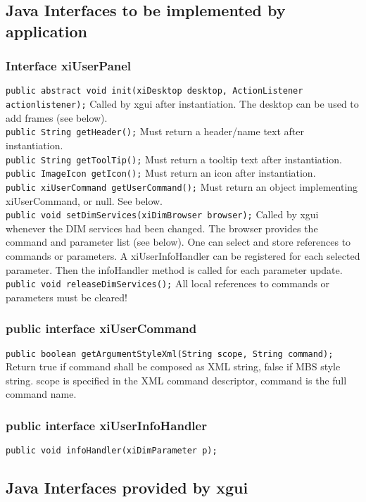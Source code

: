 \subsection{Java Interfaces to be implemented by application}
\subsubsection{Interface xiUserPanel}
{\tt public abstract void init(xiDesktop desktop, ActionListener actionlistener);}
Called by xgui after instantiation. The desktop can be used to add frames (see below).\\
{\tt public String getHeader();}
Must return a header/name text after instantiation.\\
{\tt public String getToolTip();}
Must return a tooltip text after instantiation.\\
{\tt public ImageIcon getIcon();}
Must return an icon after instantiation.\\
{\tt public xiUserCommand getUserCommand();}
Must return an object implementing xiUserCommand, or null. See below.\\
{\tt public void setDimServices(xiDimBrowser browser);}
Called by xgui whenever the DIM services had been changed.
The browser provides the command and parameter list (see below). One can select and store references to commands or parameters. A xiUserInfoHandler can be registered for each selected parameter. Then the infoHandler method is called for each parameter update.\\
{\tt public void releaseDimServices();}
All local references to commands or parameters must be cleared!

\subsubsection{public interface xiUserCommand}
{\tt public boolean getArgumentStyleXml(String scope, String command);}
Return true if command shall be composed as XML string, false if MBS style string. scope is specified in the XML command descriptor, command is the full command name.

\subsubsection{public interface xiUserInfoHandler}
{\tt public void infoHandler(xiDimParameter p);}

\subsection{Java Interfaces provided by xgui}
